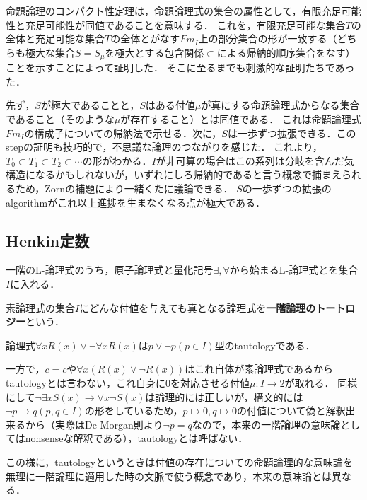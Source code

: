 \documentclass[uplatex, dvipdfmx]{jsreport}
\begin{document}
\begin{screen}
    命題論理のコンパクト性定理は，命題論理式の集合の属性として，有限充足可能性と充足可能性が同値であることを意味する．
    これを，有限充足可能な集合$T$の全体と充足可能な集合$T$の全体とがなす$Fm_I$上の部分集合の形が一致する（どちらも極大な集合$S=S_\mu$を極大とする包含関係$\subset$による帰納的順序集合をなす）ことを示すことによって証明した．
    そこに至るまでも刺激的な証明たちであった．
    
    先ず，$S$が極大であることと，$S$はある付値$\mu$が真にする命題論理式からなる集合であること（そのような$\mu$が存在すること）とは同値である．
    これは命題論理式$Fm_I$の構成子についての帰納法で示せる．次に，$S$は一歩ずつ拡張できる．このstepの証明も技巧的で，不思議な論理のつながりを感じた．
    これより，$T_0\subset T_1\subset T_2\subset\cdots$の形がわかる．$I$が非可算の場合はこの系列は分岐を含んだ気構造になるかもしれないが，いずれにしろ帰納的であると言う概念で捕まえられるため，Zornの補題により一緒くたに議論できる．
    $S$の一歩ずつの拡張のalgorithmがこれ以上進捗を生まなくなる点が極大である．
\end{screen}

\subsection{Henkin定数}

\begin{definition}[一階論理の命題論理への翻訳]\label{def-interpretation-first-to-zero}
    一階のL-論理式のうち，原子論理式と量化記号$\exists,\forall$から始まるL-論理式とを集合$I$に入れる．
\end{definition}

\begin{definition}
    素論理式の集合$I$にどんな付値を与えても真となる論理式を\textbf{一階論理のトートロジー}という．
\end{definition}
\begin{example}[一階論理では恒真であることとtautologyであることにはズレがある]
    論理式$\forall xR(x)\lor\lnot\forall xR(x)$は$p\lor\lnot p(p\in I)$型のtautologyである．

    一方で，$c=c$や$\forall x(R(x)\lor\lnot R(x))$はこれ自体が素論理式であるからtautologyとは言わない，これ自身に$0$を対応させる付値$\mu:I\to 2$が取れる．
    同様にして$\lnot\exists xS(x)\to\forall x\lnot S(x)$は論理的には正しいが，構文的には$\lnot p\to q(p,q\in I)$の形をしているため，$p\mapsto 0,q\mapsto 0$の付値について偽と解釈出来るから（実際はDe Morgan則より$\lnot p =q$なので，本来の一階論理の意味論としてはnonsenseな解釈である），tautologyとは呼ばない．

    この様に，tautologyというときは付値の存在についての命題論理的な意味論を無理に一階論理に適用した時の文脈で使う概念であり，本来の意味論とは異なる．
\end{example}
\end{document}
